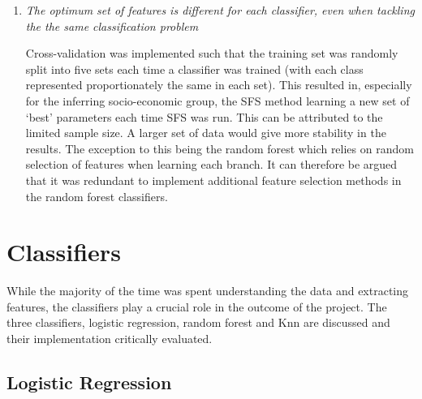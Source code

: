 \begin{enumerate}
\item \textit{The optimum set of features is different for each classifier, even when tackling the the same classification problem}

Cross-validation was implemented such that the training set was randomly split into five sets each time a classifier was trained (with each class represented proportionately the same in each set). This resulted in, especially for the inferring socio-economic group, the SFS method learning a new set of `best' parameters each time SFS was run. This can be attributed to the limited sample size. A larger set of data would give more stability in the results. The exception to this being the random forest which relies on random selection of features when learning each branch. It can therefore be argued that it was redundant to implement additional feature selection methods in the random forest classifiers.

\end{enumerate}

\section{Classifiers}

While the majority of the time was spent understanding the data and extracting features, the classifiers play a crucial role in the outcome of the project.  The three classifiers, logistic regression, random forest and Knn are discussed and their implementation critically evaluated.

\subsection{Logistic Regression}

